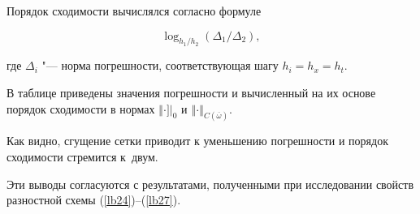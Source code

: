 Порядок сходимости вычислялся согласно формуле 

$$\log_{h_1/h_2}(\Delta_1/\Delta_2),$$

где $\Delta_i$ "--- норма погрешности, соответствующая шагу $h_i=h_x=h_t$.



В таблице приведены значения погрешности и вычисленный на их основе порядок сходимости в нормах $\left\Vert \cdot \right.]|_0$ и $\left\Vert \cdot \right\Vert_{C(\overline{\omega})}$. 

Как видно, сгущение сетки приводит к уменьшению погрешности и порядок сходимости стремится к~двум. 

Эти выводы согласуются с результатами, полученными при исследовании свойств разностной схемы (\ref{lb24})--(\ref{lb27}).










